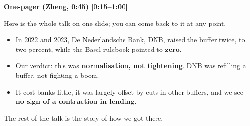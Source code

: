 {\small\textbf{One-pager (Zheng, 0:45) [0:15–1:00]}}\par\smallskip
Here is the whole talk on one slide; you can come back to it at any point.
\begin{itemize}\setlength\itemsep{0pt}
\item In 2022 and 2023, De Nederlandsche Bank, DNB, raised the buffer twice, to two percent, while the Basel rulebook pointed to \textbf{zero}.
\item Our verdict: this was \textbf{normalisation, not tightening}. DNB was refilling a buffer, not fighting a boom.
\item It cost banks little, it was largely offset by cuts in other buffers, and we see \textbf{no sign of a contraction in lending}.
\end{itemize}
\par\smallskip
The rest of the talk is the story of how we got there.
